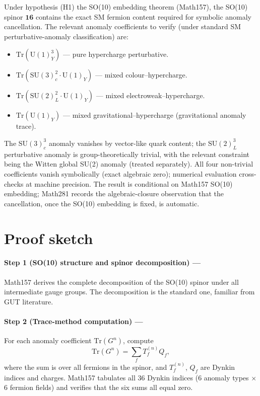 \begin{theorem}
\label{thm:main}
Under hypothesis (H1) the SO(10) embedding theorem (Math157), the SO(10)
spinor $\mathbf{16}$ contains the exact SM fermion content required
for symbolic anomaly cancellation. The relevant anomaly coefficients
to verify (under standard SM perturbative-anomaly classification) are:
\begin{itemize}[leftmargin=1.4em]
\item $\mathrm{Tr}(\mathrm{U}(1)_Y^3)$ --- pure hypercharge perturbative.
\item $\mathrm{Tr}(\mathrm{SU}(3)_c^2 \cdot \mathrm{U}(1)_Y)$ --- mixed
  colour--hypercharge.
\item $\mathrm{Tr}(\mathrm{SU}(2)_L^2 \cdot \mathrm{U}(1)_Y)$ --- mixed
  electroweak--hypercharge.
\item $\mathrm{Tr}(\mathrm{U}(1)_Y)$ --- mixed gravitational--hypercharge
  (gravitational anomaly trace).
\end{itemize}
The $\mathrm{SU}(3)_c^3$ anomaly vanishes by vector-like quark
content; the $\mathrm{SU}(2)_L^3$ perturbative anomaly is
group-theoretically trivial, with the relevant constraint being the
Witten global SU(2) anomaly (treated separately). All four
non-trivial coefficients vanish symbolically (exact algebraic zero);
numerical evaluation cross-checks at machine precision. The result
is conditional on Math157 SO(10) embedding; Math281 records the
algebraic-closure observation that the cancellation, once the SO(10)
embedding is fixed, is automatic.
\end{theorem}

\section{Proof sketch}
\paragraph{Step 1 (SO(10) structure and spinor decomposition) ---}
Math157 derives the complete decomposition of the SO(10) spinor under
all intermediate gauge groups. The decomposition is the standard one,
familiar from GUT literature.

\paragraph{Step 2 (Trace-method computation) ---}
For each anomaly coefficient $\text{Tr}(G^n)$, compute
\begin{equation}
\text{Tr}(G^n) = \sum_f T_f^{(n)} Q_f,
\end{equation}
where the sum is over all fermions in the spinor, and $T_f^{(n)}$, $Q_f$
are Dynkin indices and charges. Math157 tabulates all 36 Dynkin indices
(6 anomaly types × 6 fermion fields) and verifies that the six sums
all equal zero.

